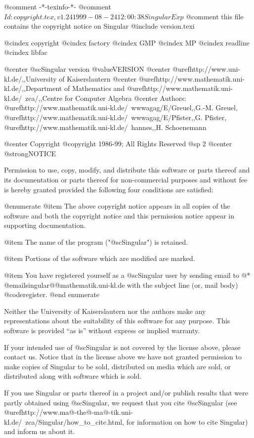@comment -*-texinfo-*-
@comment $Id: copyright.tex,v 1.24 1999-08-24 12:00:38 Singular Exp $
@comment this file contains the copyright notice on Singular
@include version.texi

@cindex copyright
@cindex factory
@cindex GMP
@cindex MP
@cindex readline
@cindex libfac

@center @sc{Singular} version @value{VERSION}
@center @uref{http://www.uni-kl.de/,,University of Kaiserslautern}
@center @uref{http://www.mathematik.uni-kl.de/,,Department of Mathematics} and  @uref{http://www.mathematik.uni-kl.de/~zca/,,Centre for Computer Algebra}
@center Authors: @uref{http://www.mathematik.uni-kl.de/~wwwagag/E/Greuel,,G.-M. Greuel}, @uref{http://www.mathematik.uni-kl.de/~wwwagag/E/Pfister,,G. Pfister}, @uref{http://www.mathematik.uni-kl.de/~hannes,,H. Schoenemann}

@center Copyright @copyright{} 1986-99; All Rights Reserved
@sp 2
@center @strong{NOTICE}

Permission to use, copy, modify, and distribute this software or parts
thereof and its documentation or parts thereof for non-commercial
purposes and without fee is hereby granted provided the following four
conditions are satisfied:

@enumerate
@item
The above copyright notice appears in all copies of the software
and both the copyright notice and this permission notice
appear in supporting documentation.

@item
The name of the program ("@sc{Singular}") is retained.

@item
Portions of the software which are modified are marked.

@item
You have registered yourself as a @sc{Singular} user by sending email to @*
@email{singular@@mathematik.uni-kl.de}
with the subject line (or, mail body)
@code{register}.
@end enumerate

Neither the University of Kaiserslautern nor the authors make any
representations about the suitability of this software for any
purpose.  This software is provided ``as is'' without express or
implied warranty.

If your intended use of @sc{Singular} is not covered by the license above,
please contact us.  Notice that in the license above we have not
granted permission to make copies of Singular to be sold, distributed
on media which are sold, or distributed along with software which is
sold.

If you use Singular or parts thereof in a project and/or publish
results that were partly obtained using @sc{Singular}, we request that you
cite @sc{Singular} (see
@uref{http://www.ma@-the@-ma@-tik.uni-kl.de/~zca/Singular/how_to_cite.html, for information}
 on how to cite Singular) and inform us about it.

